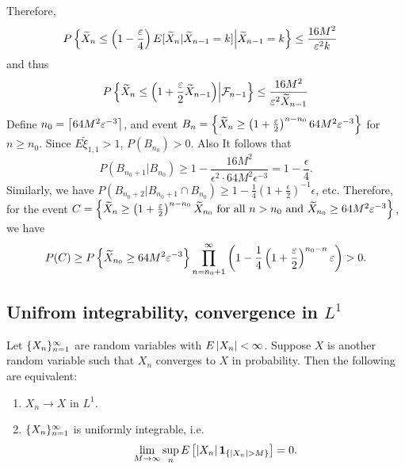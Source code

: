 \documentclass[a4paper]{article}
\begin{document}
\begin{eg}
\[  \]
  Therefore,
  \begin{align*}
    P \left\{ \widetilde{X}_n \leq \left( 1 - \frac{\varepsilon}{4} \right)
    E [\widetilde{X}_n | \widetilde{X}_{n - 1} = k ] \middle| \widetilde{X}_{n - 1} = k \right\}
     & \leq \frac{16 M^2}{\varepsilon^2 k}
  \end{align*}
  and thus
  \[
    P \left\{ \widetilde{X}_n \leq \left( 1 + \frac{\varepsilon}{2}
    \widetilde{X}_{n - 1} \right) \middle| \mathcal{F}_{n - 1} \right\}
    \leq \frac{16 M^2}{\varepsilon^2 \widetilde{X}_{n - 1}}
  \]
  Define $n_0 = \left\lceil 64 M^2 \varepsilon^{-3} \right\rceil$,
  and event $B_n = \left\{ \widetilde{X}_{n} \geq \left( 1 + \frac{\varepsilon}{2} \right)^{n - n_0}
    64 M^2 \varepsilon^{-3} \right\}$ for $n \geq n_0$.
  Since $E \tilde{\xi}_{1,1} > 1$, $P(B_{n_0}) > 0$. Also
  It follows that
  \[
    P (B_{n_0 + 1} | B_{n_0}) \geq 1 - \frac{16 M^2}{\epsilon^2
      \cdot 64 M^2 \epsilon^{-3}} = 1 - \frac{\epsilon}{4}.
  \]
  Similarly, we have $P(B_{n_0 + 2} | B_{n_0 + 1} \cap B_{n_0})
    \geq 1 - \frac{1}{4} (1 + \frac{\epsilon}{2})^{-1} \epsilon$,
  etc. Therefore,
  for the event $C = \left\{ \widetilde{X}_n \geq \left( 1 + \frac{\varepsilon}{2}
    \right)^{n - n_0} \widetilde{X}_{n_0}
    \text{ for all } n > n_0 \text{ and }
    \widetilde{X}_{n_0} \geq 64 M^2 \varepsilon^{-3} \right\}$, we have
  \begin{align*}
    P (C) \geq P \left\{ \widetilde{X}_{n_0} \geq 64 M^2 \varepsilon^{-3} \right\}
    \prod_{n = n_0 + 1}^\infty \left( 1 -
                               \frac{1}{4} \left( 1 + \frac{\varepsilon}{2} \right)^{n_0 - n}
    \varepsilon \right) > 0.
  \end{align*}

\end{eg}


\subsection{Unifrom integrability, convergence in $L^1$}

\begin{thm}
  Let $\{ X_n \}_{n=1}^\infty$ are random variables with $E \left\lvert X_n\right\rvert < \infty$.
  Suppose $X$ is another random variable such that $X_n$ converges
  to $X$ in probability. Then the following are equivalent:
  \begin{enumerate}
    \item $X_n \to X$ in $L^1$.
    \item $\{ X_n \}_{n=1}^\infty$ is uniformly integrable, i.e.\
          \[
            \lim_{M \to \infty} \sup_n E \left[ \left\lvert X_n\right\rvert \operatorname{\mathbf{1}}_{\{\left\lvert X_n\right\rvert > M\}}
              \right] = 0.
          \]
  \end{enumerate}
\end{thm}
\end{document}
